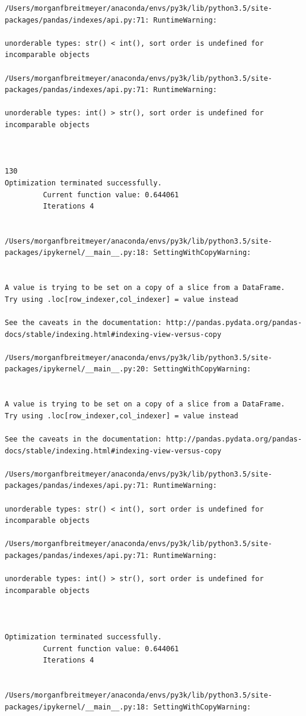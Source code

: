 \begin{lstlisting}
/Users/morganfbreitmeyer/anaconda/envs/py3k/lib/python3.5/site-packages/pandas/indexes/api.py:71: RuntimeWarning:

unorderable types: str() < int(), sort order is undefined for incomparable objects

/Users/morganfbreitmeyer/anaconda/envs/py3k/lib/python3.5/site-packages/pandas/indexes/api.py:71: RuntimeWarning:

unorderable types: int() > str(), sort order is undefined for incomparable objects



130
Optimization terminated successfully.
         Current function value: 0.644061
         Iterations 4


/Users/morganfbreitmeyer/anaconda/envs/py3k/lib/python3.5/site-packages/ipykernel/__main__.py:18: SettingWithCopyWarning:


A value is trying to be set on a copy of a slice from a DataFrame.
Try using .loc[row_indexer,col_indexer] = value instead

See the caveats in the documentation: http://pandas.pydata.org/pandas-docs/stable/indexing.html#indexing-view-versus-copy

/Users/morganfbreitmeyer/anaconda/envs/py3k/lib/python3.5/site-packages/ipykernel/__main__.py:20: SettingWithCopyWarning:


A value is trying to be set on a copy of a slice from a DataFrame.
Try using .loc[row_indexer,col_indexer] = value instead

See the caveats in the documentation: http://pandas.pydata.org/pandas-docs/stable/indexing.html#indexing-view-versus-copy

/Users/morganfbreitmeyer/anaconda/envs/py3k/lib/python3.5/site-packages/pandas/indexes/api.py:71: RuntimeWarning:

unorderable types: str() < int(), sort order is undefined for incomparable objects

/Users/morganfbreitmeyer/anaconda/envs/py3k/lib/python3.5/site-packages/pandas/indexes/api.py:71: RuntimeWarning:

unorderable types: int() > str(), sort order is undefined for incomparable objects



Optimization terminated successfully.
         Current function value: 0.644061
         Iterations 4


/Users/morganfbreitmeyer/anaconda/envs/py3k/lib/python3.5/site-packages/ipykernel/__main__.py:18: SettingWithCopyWarning:



\end{lstlisting}
